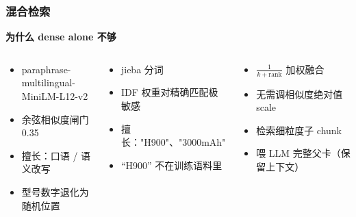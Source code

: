 \documentclass[aspectratio=169,10pt]{beamer}
\newcommand{\mono}[1]{{\ttfamily\small\color{Cblue!90!black}#1}}  %
\begin{document}
\begin{frame}
\frametitle{混合检索}

{\small\bfseries\color{Cmuted}为什么 dense alone 不够}\\[0.08cm]
\begin{columns}[T]
\begin{tcolorbox}[tcblue, title={\color{Cblue}Dense（语义）}]
\small\begin{itemize}\setlength\itemsep{0.25em}
  \item paraphrase-multilingual-\\MiniLM-L12-v2
  \item 余弦相似度闸门 \mono{0.35}
  \item 擅长：口语 / 语义改写
  \item {\small\color{Cmuted}型号数字退化为随机位置}
\end{itemize}
\end{tcolorbox}

\begin{tcolorbox}[tcamber, title={\color{orange!80!black}BM25（词法）}]
\small\begin{itemize}\setlength\itemsep{0.25em}
  \item jieba 分词
  \item IDF 权重对精确匹配极敏感
  \item 擅长：\mono{"H900"}、\mono{"3000mAh"}
  \item {\small\color{Cmuted}``H900'' 不在训练语料里}
\end{itemize}
\end{tcolorbox}

\begin{tcolorbox}[tcgreen, title={\color{Cgreen}RRF + 父子文档}]
\small\begin{itemize}\setlength\itemsep{0.25em}
  \item $\tfrac{1}{k+\mathrm{rank}}$ 加权融合
  \item 无需调相似度绝对值 scale
  \item 检索细粒度子 chunk
  \item 喂 LLM 完整父卡（保留上下文）
\end{itemize}
\end{tcolorbox}
\end{columns}



\end{frame}
\end{document}
